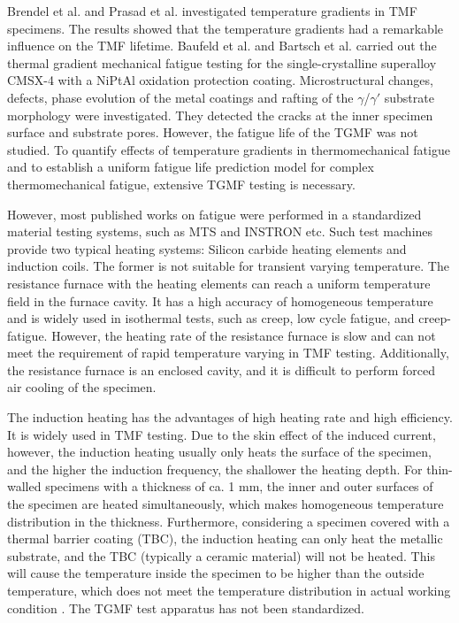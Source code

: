 \documentclass[preprint,5p,twocolumn,10pt,sort&compress]{elsarticle}
\begin{document}
Brendel et al. \cite{BRENDEL2008234} and Prasad et al. \cite{PRASAD2013131} investigated temperature gradients in TMF specimens. The results showed that the temperature gradients had a remarkable influence on the TMF lifetime.
Baufeld et al. \cite{BAUFELD2008219} and Bartsch et al. \cite{BARTSCH2008211} carried out the thermal gradient mechanical fatigue testing for the single-crystalline superalloy CMSX-4 with a NiPtAl oxidation protection coating.
Microstructural changes, defects, phase evolution of the metal coatings and rafting of the $\gamma$/$\gamma'$ substrate morphology were investigated. They detected the cracks at the inner specimen surface and substrate pores. However, the fatigue life of the TGMF was not studied. To quantify effects of temperature gradients in thermomechanical fatigue and to establish a uniform fatigue life prediction model for complex thermomechanical fatigue, extensive TGMF testing is necessary.

However, most published works on fatigue were performed in a standardized material testing systems, such as MTS and INSTRON etc. Such test machines provide two typical heating systems: Silicon carbide heating elements and induction coils. The former is not suitable for transient varying temperature. 
The resistance furnace with the heating elements can reach a uniform temperature field in the furnace cavity. It has a high accuracy of homogeneous temperature and is widely used in isothermal tests, such as creep, low cycle fatigue, and creep-fatigue. However, the heating rate of the resistance furnace is slow and can not meet the requirement of rapid temperature varying in TMF testing. Additionally, the resistance furnace is an enclosed cavity, and it is difficult to perform forced air cooling of the specimen.

The induction heating has the advantages of high heating rate and high efficiency. It is widely used in TMF testing.
Due to the skin effect of the induced current, however, the induction heating usually only heats the surface of the specimen, and the higher the induction frequency, the shallower the heating depth. For thin-walled specimens with a thickness of ca. 1 mm, the inner and outer surfaces of the specimen are heated simultaneously, which makes homogeneous temperature distribution in the thickness. Furthermore, considering a specimen covered with a thermal barrier coating (TBC), the induction heating can only heat the metallic substrate, and the TBC (typically a ceramic material) will not be heated. This will cause the temperature inside the specimen to be higher than the outside temperature, which does not meet the temperature distribution in actual working condition \cite{BRENDEL2008234}. The TGMF test apparatus has not been standardized. 
\end{document}
